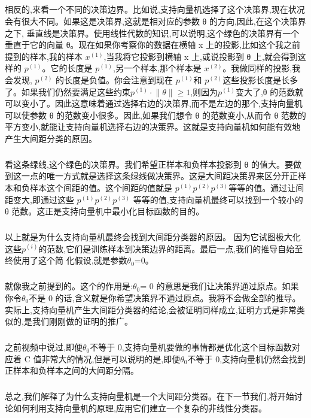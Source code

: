 \documentclass{article}
\begin{document}
\begin{CJK}{UTF8}{gbsn}
\subparagraph{}
\begin{figure}[H]
\label{fig:723}
\end{figure}
相反的,来看一个不同的决策边界。比如说,支持向量机选择了这个决策界,现在状况会有很大不同。如果这是决策界,这就是相对应的参数 θ 的方向,因此,在这个决策界之下,
垂直线是决策界。使用线性代数的知识,可以说明,这个绿色的决策界有一个垂直于它的向量 θ。现在如果你考察你的数据在横轴 x 上的投影,比如这个我之前提到的样本,我的样本
$x^{(1)}$,当我将它投影到横轴 x 上,或说投影到 θ 上,就会得到这样的 $p^{(1)}$。它的长度是 $p^{(1)}$,另一个样本,那个样本是 $x^{(2)}$。我做同样的投影,我会发现, $p^{(2)}$ 的长度是负值。你会注意到现在  $p^{(1)}$和  $p^{(2)}$这些投影长度是长多了。如果我们仍然要满足这些约束$p^{(1)}\cdot{\parallel{\theta}\parallel}\geq{1}$,则因为$p^{(1)}$变大了,θ 的范数就可以变小了。因此这意味着通过选择右边的决策界,而不是左边的那个,支持向量机可以使参数 θ 的范数变小很多。因此,如果我们想令 θ 的范数变小,从而令 θ 范数的平方变小,就能让支持向量机选择右边的决策界。这就是支持向量机如何能有效地产生大间距分类的原因。
\subparagraph{}
看这条绿线,这个绿色的决策界。我们希望正样本和负样本投影到 θ 的值大。要做到这一点的唯一方式就是选择这条绿线做决策界。这是大间距决策界来区分开正样本和负样本这个间距的值。这个间距的值就是 $p^{(1)}p^{(2)}p^{(3)}$等等的值。通过让间距变大,即通过这些 $p^{(1)}p^{(2)}p^{(3)}$ 等等的值,支持向量机最终可以找到一个较小的 θ 范数。这正是支持向量机中最小化目标函数的目的。
\subparagraph{}
以上就是为什么支持向量机最终会找到大间距分类器的原因。
因为它试图极大化这些$p^{(i)}$的范数,它们是训练样本到决策边界的距离。最后一点,我们的推导自始至终使用了这个简
化假设,就是参数$\theta_0$=0。
\subparagraph{}
就像我之前提到的。这个的作用是:$\theta_0$= 0 的意思是我们让决策界通过原点。如果你令$\theta_0$不是 0 的话,含义就是你希望决策界不通过原点。我将不会做全部的推导。实际上,支持向量机产生大间距分类器的结论,会被证明同样成立,证明方式是非常类似的,是我们刚刚做的证明的推广。
\begin{figure}[H]
\label{fig:724}
\end{figure}
\subparagraph{}
之前视频中说过,即便$\theta_0$不等于 0,支持向量机要做的事情都是优化这个目标函数对应着 C 值非常大的情况,但是可以说明的是,即便$\theta_0$不等于 0,支持向量机仍然会找到正样本和负样本之间的大间距分隔。
\subparagraph{}
总之,我们解释了为什么支持向量机是一个大间距分类器。在下一节我们,将开始讨论如何利用支持向量机的原理,应用它们建立一个复杂的非线性分类器。
\begin{figure}[H]
\label{fig:725}
\end{figure}
\begin{figure}[H]
\label{fig:726}
\end{figure}
\begin{figure}[H]
\label{fig:727}
\end{figure}

\end{CJK}
\end{document}

